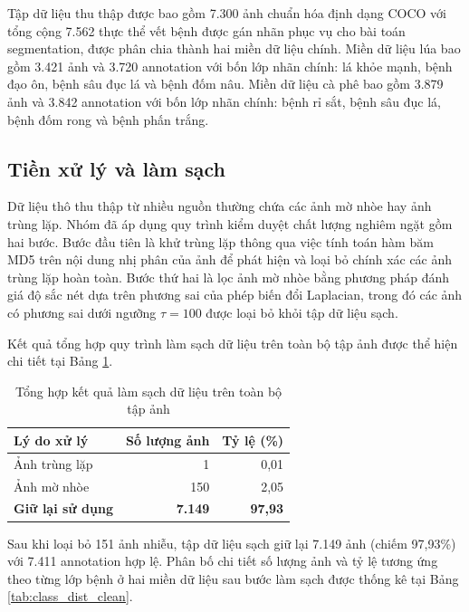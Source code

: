 Tập dữ liệu thu thập được bao gồm 7.300 ảnh chuẩn hóa định dạng COCO với tổng cộng 7.562 thực thể vết bệnh được gán nhãn phục vụ cho bài toán segmentation, được phân chia thành hai miền dữ liệu chính. Miền dữ liệu lúa bao gồm 3.421 ảnh và 3.720 annotation với bốn lớp nhãn chính: lá khỏe mạnh, bệnh đạo ôn, bệnh sâu đục lá và bệnh đốm nâu. Miền dữ liệu cà phê bao gồm 3.879 ảnh và 3.842 annotation với bốn lớp nhãn chính: bệnh rỉ sắt, bệnh sâu đục lá, bệnh đốm rong và bệnh phấn trắng.

\subsection{Tiền xử lý và làm sạch}
Dữ liệu thô thu thập từ nhiều nguồn thường chứa các ảnh mờ nhòe hay ảnh trùng lặp. Nhóm đã áp dụng quy trình kiểm duyệt chất lượng nghiêm ngặt gồm hai bước. Bước đầu tiên là khử trùng lặp thông qua việc tính toán hàm băm MD5 trên nội dung nhị phân của ảnh để phát hiện và loại bỏ chính xác các ảnh trùng lặp hoàn toàn. Bước thứ hai là lọc ảnh mờ nhòe bằng phương pháp đánh giá độ sắc nét dựa trên phương sai của phép biến đổi Laplacian, trong đó các ảnh có phương sai dưới ngưỡng $\tau = 100$ được loại bỏ khỏi tập dữ liệu sạch.

Kết quả tổng hợp quy trình làm sạch dữ liệu trên toàn bộ tập ảnh được thể hiện chi tiết tại Bảng \ref{tab:data_clean_summary}.

\begin{table}[htbp]
    \centering
    \caption{Tổng hợp kết quả làm sạch dữ liệu trên toàn bộ tập ảnh}
    \label{tab:data_clean_summary}
    \begin{tabular}{lrr}
        \toprule
        \textbf{Lý do xử lý}     & \textbf{Số lượng ảnh}   & \textbf{Tỷ lệ (\%)}     \\
        \midrule
        Ảnh trùng lặp            & 1              & 0,01           \\
        Ảnh mờ nhòe              & 150            & 2,05           \\
        \textbf{Giữ lại sử dụng} & \textbf{7.149} & \textbf{97,93} \\
        \bottomrule
    \end{tabular}
\end{table}

Sau khi loại bỏ 151 ảnh nhiễu, tập dữ liệu sạch giữ lại 7.149 ảnh (chiếm 97,93\%) với 7.411 annotation hợp lệ. Phân bố chi tiết số lượng ảnh và tỷ lệ tương ứng theo từng lớp bệnh ở hai miền dữ liệu sau bước làm sạch được thống kê tại Bảng \ref{tab:class_dist_clean}.

